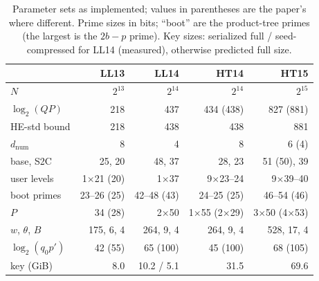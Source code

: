 \documentclass[sigconf,nonacm]{acmart}
\newcommand{\lgqp}{\log_2(q_0 p')}
\begin{document}
\begin{table}[t]
\caption{Parameter sets as implemented; values in parentheses are the paper's where different. Prime sizes in bits; ``boot'' are the product-tree primes (the largest is the $2b-p$ prime). Key sizes: serialized full / seed-compressed for LL14 (measured), otherwise predicted full size.}
\label{tab:keys}
\small
\setlength{\tabcolsep}{3pt}
\begin{tabular}{lrrrr}
\toprule
 & LL13 & LL14 & HT14 & HT15 \\
\midrule
$N$ & $2^{13}$ & $2^{14}$ & $2^{14}$ & $2^{15}$ \\
$\log_2(QP)$ & 218 & 437 & 434 (438) & 827 (881) \\
HE-std bound & 218 & 438 & 438 & 881 \\
$d_{\mathrm{num}}$ & 8 & 4 & 8 & 6 (4) \\
base, S2C & 25, 20 & 48, 37 & 28, 23 & 51 (50), 39 \\
user levels & 1$\times$21 (20) & 1$\times$37 & 9$\times$23--24 & 9$\times$39--40 \\
boot primes & 23--26 (25) & 42--48 (43) & 24--25 (25) & 46--54 (46) \\
$P$ & 34 (28) & 2$\times$50 & 1$\times$55 (2$\times$29) & 3$\times$50 (4$\times$53) \\
$w$, $\theta$, $B$ & 175, 6, 4 & 264, 9, 4 & 264, 9, 4 & 528, 17, 4 \\
$\lgqp$ & 42 (55) & 65 (100) & 45 (100) & 68 (105) \\
key (GiB) & 8.0 & 10.2 / 5.1 & 31.5 & 69.6 \\
\bottomrule
\end{tabular}
\end{table}
\end{document}

